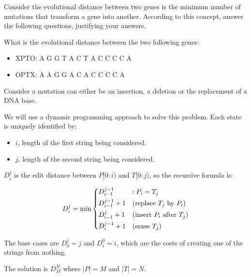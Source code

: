 \documentclass{cal}
\begin{document}
{
Consider the evolutional distance between two genes is the minimum number of mutations that transform a gene into another. According to this concept, answer the following questions, justifying your answers.

What is the evolutional distance between the two following genes:
\begin{itemize}
    \item XPTO: A G G T A C T A C C C C A
    \item OPTX: A A G G A C A C C C C A
\end{itemize}

\ansseparator

Consider a mutation can either be an insertion, a deletion or the replacement of a DNA base.

We will use a dynamic programming approach to solve this problem. Each state is uniquely identified by:
\begin{itemize}
    \item $i$, length of the first string being considered.
    \item $j$, length of the second string being considered.
\end{itemize}

$D_i^j$ is the edit distance between $P[0:i)$ and $T[0:j)$, so the recursive formula is:

\begin{equation*}
    D_i^j = \min \begin{dcases}
        D_{i-1}^{j-1}   & : P_i = T_j \\
        D_{i-1}^{j-1}+1 & \text{(replace $T_j$ by $P_i$)} \\
        D_{i-1}^{j  }+1 & \text{(insert $P_i$ after $T_j$)} \\
        D_{i  }^{j-1}+1 & \text{(erase $T_j$)}
    \end{dcases}
\end{equation*}

The base cases are $D_0^j = j$ and $D_i^0 = i$, which are the costs of creating one of the strings from nothing.

The solution is $D_M^N$ where $|P|=M$ and $|T|=N$.

}
\end{document}
